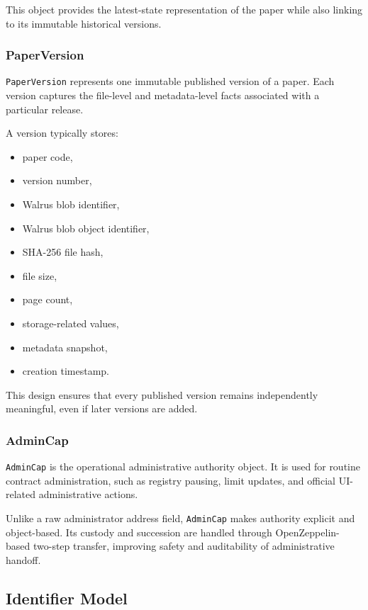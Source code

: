 \documentclass[journal]{IEEEtran}
\begin{document}
This object provides the latest-state representation of the paper while also linking to its immutable historical versions.

\subsubsection{PaperVersion}

\texttt{PaperVersion} represents one immutable published version of a paper. Each version captures the file-level and metadata-level facts associated with a particular release.

A version typically stores:
\begin{itemize}
    \item paper code,
    \item version number,
    \item Walrus blob identifier,
    \item Walrus blob object identifier,
    \item SHA-256 file hash,
    \item file size,
    \item page count,
    \item storage-related values,
    \item metadata snapshot,
    \item creation timestamp.
\end{itemize}


This design ensures that every published version remains independently meaningful, even if later versions are added.

\subsubsection{AdminCap}

\texttt{AdminCap} is the operational administrative authority object. It is used for routine contract administration, such as registry pausing, limit updates, and official UI-related administrative actions.

Unlike a raw administrator address field, \texttt{AdminCap} makes authority explicit and object-based. Its custody and succession are handled through OpenZeppelin-based two-step transfer, improving safety and auditability of administrative handoff.

\subsection{Identifier Model}
\end{document}
